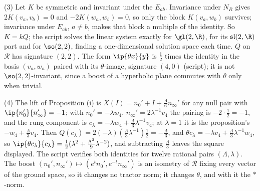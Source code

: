 (3) Let $K$ be symmetric and invariant under the $E_{ab}$. Invariance under $N_{R}$ gives $2K(v_{a}, v_{b}) = 0$ and $-2K(w_{a}, w_{b}) = 0$, so only the block $K(v_{a}, w_{b})$ survives; invariance under $E_{ab}$, $a \neq b$, makes that block a multiple of the identity. So $K = kQ$; the script solves the linear system exactly for $\gl(2,\R)$, for its $\mathfrak{sl}(2,\R)$ part and for $\so(2,2)$, finding a one-dimensional solution space each time. $Q$ on $\mathcal{R}$ has signature $(2,2)$. The form $\ip{\theta x}{y}$ is $\tfrac12$ times the identity in the basis $(v_{a}, w_{a})$ paired with its $\theta$-image, signature $(4,0)$ (script); it is not $\so(2,2)$-invariant, since a boost of a hyperbolic plane commutes with $\theta$ only when trivial.

(4) The lift of Proposition (i) is $X(I) = n_{0}' + I + \tfrac{\Lambda}{6}n_{\infty}'$ for any null pair with $\ip{n_{0}'}{n_{\infty}'} = -1$; with $n_{0}' = -\lambda w_{4}$, $n_{\infty}' = 2\lambda^{-1}v_{4}$ the pairing is $-2\cdot\tfrac12 = -1$, and the rung component is $c_{\lambda} = -\lambda w_{4} + \tfrac{\Lambda}{3}\lambda^{-1}v_{4}$; at $\lambda = 1$ it is the proposition's $-w_{4} + \tfrac{\Lambda}{3}v_{4}$. Then $Q(c_{\lambda}) = 2(-\lambda)(\tfrac{\Lambda}{3}\lambda^{-1})\tfrac12 = -\tfrac{\Lambda}{3}$, and $\theta c_{\lambda} = -\lambda v_{4} + \tfrac{\Lambda}{3}\lambda^{-1}w_{4}$, so $\ip{\theta c_{\lambda}}{c_{\lambda}} = \tfrac12(\lambda^{2} + \tfrac{\Lambda^{2}}{9}\lambda^{-2})$, and subtracting $\tfrac{\Lambda}{3}$ leaves the square displayed. The script verifies both identities for twelve rational pairs $(\Lambda, \lambda)$. The boost $(n_{0}', n_{\infty}') \mapsto (e^{t}n_{0}', e^{-t}n_{\infty}')$ is an isometry of $\mathcal{R}$ fixing every vector of the ground space, so it changes no tractor norm; it changes $\theta$, and with it the $*$-norm.

